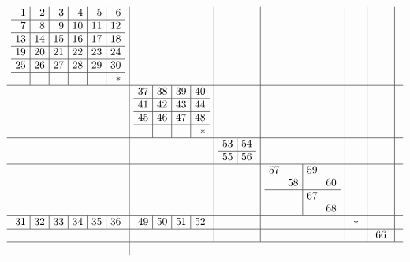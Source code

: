 \documentclass[12pt,a4paper]{amsart}
\begin{document}
\begin{align*}\arraycolsep4pt
\begin{array}{c|c|c|c|c|c|c}
\begin{array}{r|r|r|r|r|r}%
1&2&3&4&5&6\\\hline%
7&8&9&10&11&12\\\hline%
13&14&15&16&17&18\\\hline%
19&20&21&22&23&24\\\hline%
25&26&27&28&29&30\\\hline%
  &  &  &  &  &*\\%
\end{array}%
&&&&&&
\\\hline
&
\begin{array}{r|r|r|r}%
37&38&39&40\\\hline%
41&42&43&44\\\hline%
45&46&47&48\\\hline%
  &  &  & *\\%
\end{array}%
&&&&&
\\\hline
&&
\begin{array}{r|r}%
53&54\\\hline%
55&56\\%
\end{array}%
&&&&
\\\hline
&&&
\begin{array}{rr|rr}%
57&  &59&  \\%
  &58&  &60\\\hline%
  &  &67&  \\%
  &  &  &68\\%
\end{array}%
&&&
\\\hline
\begin{array}{r|r|r|r|r|r}%
31&32&33&34&35&36\\%
\end{array}%
&
\begin{array}{r|r|r|r}%
49&50&51&52\\%
\end{array}%
&&&
\begin{array}{r}%
 *\\%
\end{array}%
&&
\\\hline
&&&&&
\begin{array}{r}%
66\\%
\end{array}%
&
\\\hline
\begin{array}{r|r|r|r|r|r}%

\end{array}
\end{array}
\end{align*}
\end{document}
